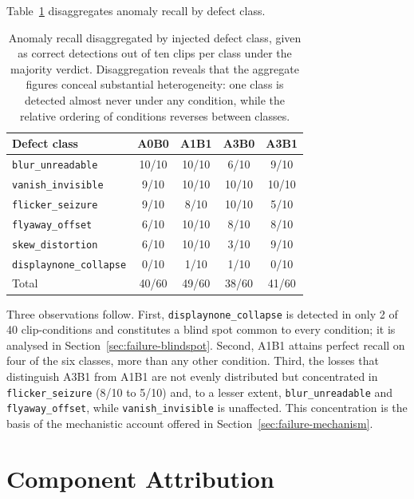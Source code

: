 Table~\ref{tab:bybug} disaggregates anomaly recall by defect class.

\begin{table}[htbp]
\centering
\caption{Anomaly recall disaggregated by injected defect class, given as
correct detections out of ten clips per class under the majority verdict.
Disaggregation reveals that the aggregate figures conceal substantial
heterogeneity: one class is detected almost never under any condition,
while the relative ordering of conditions reverses between classes.}
\label{tab:bybug}
\small
\begin{tabular}{@{}lcccc@{}}
\toprule
Defect class & A0B0 & A1B1 & A3B0 & A3B1 \\
\midrule
\texttt{blur\_unreadable}      & 10/10 & 10/10 & 6/10  & 9/10 \\
\texttt{vanish\_invisible}     & 9/10  & 10/10 & 10/10 & 10/10 \\
\texttt{flicker\_seizure}      & 9/10  & 8/10  & 10/10 & 5/10 \\
\texttt{flyaway\_offset}       & 6/10  & 10/10 & 8/10  & 8/10 \\
\texttt{skew\_distortion}      & 6/10  & 10/10 & 3/10  & 9/10 \\
\texttt{displaynone\_collapse} & 0/10  & 1/10  & 1/10  & 0/10 \\
\midrule
Total                          & 40/60 & 49/60 & 38/60 & 41/60 \\
\bottomrule
\end{tabular}
\end{table}

Three observations follow. First, \texttt{displaynone\_collapse} is
detected in only 2 of 40 clip-conditions and constitutes a blind spot
common to every condition; it is analysed in
Section~\ref{sec:failure-blindspot}. Second, A1B1 attains perfect recall
on four of the six classes, more than any other condition. Third, the
losses that distinguish A3B1 from A1B1 are not evenly distributed but
concentrated in \texttt{flicker\_seizure} (8/10 to 5/10) and, to a lesser
extent, \texttt{blur\_unreadable} and \texttt{flyaway\_offset}, while
\texttt{vanish\_invisible} is unaffected. This concentration is the basis
of the mechanistic account offered in Section~\ref{sec:failure-mechanism}.


\section{Component Attribution}
\label{sec:attribution}


